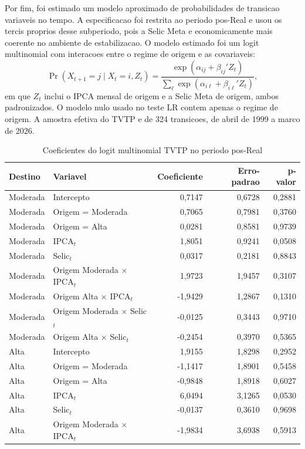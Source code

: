 Por fim, foi estimado um modelo aproximado de probabilidades de transicao variaveis no tempo. A especificacao foi restrita ao periodo pos-Real e usou os tercis proprios desse subperiodo, pois a Selic Meta e economicamente mais coerente no ambiente de estabilizacao. O modelo estimado foi um logit multinomial com interacoes entre o regime de origem e as covariaveis:
\[
\Pr(X_{t+1}=j\mid X_t=i,Z_t)
=
\frac{\exp(\alpha_{ij}+\beta_{ij}'Z_t)}
{\sum_{\ell}\exp(\alpha_{i\ell}+\beta_{i\ell}'Z_t)},
\]
em que \(Z_t\) inclui o IPCA mensal de origem e a Selic Meta de origem, ambos padronizados. O modelo nulo usado no teste LR contem apenas o regime de origem. A amostra efetiva do TVTP e de 324 transicoes, de abril de 1999 a marco de 2026.

\begin{table}[H]
\centering
\caption{Coeficientes do logit multinomial TVTP no periodo pos-Real}
\label{tab:tvtp_coeficientes}
\scriptsize
\begin{tabular}{llrrr}
\hline
Destino & Variavel & Coeficiente & Erro-padrao & p-valor \\
\hline
Moderada & Intercepto & 0,7147 & 0,6728 & 0,2881 \\
Moderada & Origem = Moderada & 0,7065 & 0,7981 & 0,3760 \\
Moderada & Origem = Alta & 0,0281 & 0,8581 & 0,9739 \\
Moderada & IPCA\(_t\) & 1,8051 & 0,9241 & 0,0508 \\
Moderada & Selic\(_t\) & 0,0317 & 0,2181 & 0,8843 \\
Moderada & Origem Moderada \(\times\) IPCA\(_t\) & 1,9723 & 1,9457 & 0,3107 \\
Moderada & Origem Alta \(\times\) IPCA\(_t\) & -1,9429 & 1,2867 & 0,1310 \\
Moderada & Origem Moderada \(\times\) Selic\(_t\) & -0,0125 & 0,3443 & 0,9710 \\
Moderada & Origem Alta \(\times\) Selic\(_t\) & -0,2454 & 0,3970 & 0,5365 \\
Alta & Intercepto & 1,9155 & 1,8298 & 0,2952 \\
Alta & Origem = Moderada & -1,1417 & 1,8901 & 0,5458 \\
Alta & Origem = Alta & -0,9848 & 1,8918 & 0,6027 \\
Alta & IPCA\(_t\) & 6,0494 & 3,1265 & 0,0530 \\
Alta & Selic\(_t\) & -0,0137 & 0,3610 & 0,9698 \\
Alta & Origem Moderada \(\times\) IPCA\(_t\) & -1,9834 & 3,6938 & 0,5913 \\

\end{tabular}
\end{table}
